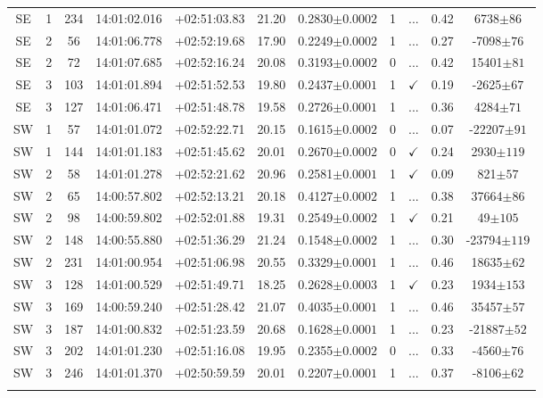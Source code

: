 \begin{landscape}
\begin{longtable}{ccccccccccc}
	SE & 1 & 234 & 14:01:02.016 & +02:51:03.83 & 21.20 & 0.2830$\pm{0.0002}$ & 1 & ... & 0.42 & 6738$\pm{86}$ \\
	SE & 2 & 56 & 14:01:06.778 & +02:52:19.68 & 17.90 & 0.2249$\pm{0.0002}$ & 1 & ... & 0.27 & -7098$\pm{76}$ \\
	SE & 2 & 72 & 14:01:07.685 & +02:52:16.24 & 20.08 & 0.3193$\pm{0.0002}$ & 0 & ... & 0.42 & 15401$\pm{81}$ \\
	SE & 3 & 103 & 14:01:01.894 & +02:51:52.53 & 19.80 & 0.2437$\pm{0.0001}$ & 1 & $\checkmark$ & 0.19 & -2625$\pm{67}$ \\
	SE & 3 & 127 & 14:01:06.471 & +02:51:48.78 & 19.58 & 0.2726$\pm{0.0001}$ & 1 & ... & 0.36 & 4284$\pm{71}$ \\
	SW & 1 & 57 & 14:01:01.072 & +02:52:22.71 & 20.15 & 0.1615$\pm{0.0002}$ & 0 & ... & 0.07 & -22207$\pm{91}$ \\
	SW & 1 & 144 & 14:01:01.183 & +02:51:45.62 & 20.01 & 0.2670$\pm{0.0002}$ & 0 & $\checkmark$ & 0.24 & 2930$\pm{119}$ \\
	SW & 2 & 58 & 14:01:01.278 & +02:52:21.62 & 20.96 & 0.2581$\pm{0.0001}$ & 1 & $\checkmark$ & 0.09 & 821$\pm{57}$ \\
	SW & 2 & 65 & 14:00:57.802 & +02:52:13.21 & 20.18 & 0.4127$\pm{0.0002}$ & 1 & ... & 0.38 & 37664$\pm{86}$ \\
	SW & 2 & 98 & 14:00:59.802 & +02:52:01.88 & 19.31 & 0.2549$\pm{0.0002}$ & 1 & $\checkmark$ & 0.21 & 49$\pm{105}$ \\
	SW & 2 & 148 & 14:00:55.880 & +02:51:36.29 & 21.24 & 0.1548$\pm{0.0002}$ & 1 & ... & 0.30 & -23794$\pm{119}$ \\
	SW & 2 & 231 & 14:01:00.954 & +02:51:06.98 & 20.55 & 0.3329$\pm{0.0001}$ & 1 & ... & 0.46 & 18635$\pm{62}$ \\
	SW & 3 & 128 & 14:01:00.529 & +02:51:49.71 & 18.25 & 0.2628$\pm{0.0003}$ & 1 & $\checkmark$ & 0.23 & 1934$\pm{153}$ \\
	SW & 3 & 169 & 14:00:59.240 & +02:51:28.42 & 21.07 & 0.4035$\pm{0.0001}$ & 1 & ... & 0.46 & 35457$\pm{57}$ \\
	SW & 3 & 187 & 14:01:00.832 & +02:51:23.59 & 20.68 & 0.1628$\pm{0.0001}$ & 1 & ... & 0.23 & -21887$\pm{52}$ \\
	SW & 3 & 202 & 14:01:01.230 & +02:51:16.08 & 19.95 & 0.2355$\pm{0.0002}$ & 0 & ... & 0.33 & -4560$\pm{76}$ \\
	SW & 3 & 246 & 14:01:01.370 & +02:50:59.59 & 20.01 & 0.2207$\pm{0.0001}$ & 1 & ... & 0.37 & -8106$\pm{62}$ \\
			\hline
	\label{2tbl:VCSJ140102.0+025242.6}
	\end{longtable}
\end{landscape}



